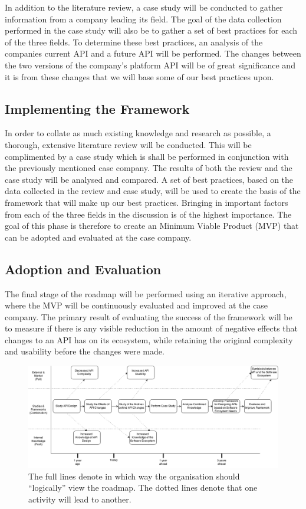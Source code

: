 \documentclass{article}
\begin{document}
In addition to the literature review, a case study will be conducted to gather information from a company leading its field. The goal of the data collection performed in the case study will also be to gather a set of best practices for each of the three fields. To determine these best practices, an analysis of the companies current API and a future API will be performed. The changes between the two versions of the company's platform API will be of great significance and it is from these changes that we will base some of our best practices upon.

\subsection{Implementing the Framework}
In order to collate as much existing knowledge and research as possible, a thorough, extensive literature review will be conducted. This will be complimented by a case study which is shall be performed in conjunction with the previously mentioned case company. The results of both the review and the case study will be analysed and compared. A set of best practices, based on the data collected in the review and case study, will be used to create the basis of the framework that will make up our best practices. Bringing in important factors from each of the three fields in the discussion is of the highest importance. The goal of this phase is therefore to create an Minimum Viable Product (MVP) that can be adopted and evaluated at the case company. 

\subsection{Adoption and Evaluation}
The final stage of the roadmap will be performed using an iterative approach, where the MVP will be continuously evaluated and improved at the case company. The primary result of evaluating the success of the framework will be to measure if there is any visible reduction in the amount of negative effects that changes to an API has on its ecosystem, while retaining the original complexity and usability before the changes were made.

\begin{figure}
\centering
\includegraphics[width=220mm]{RoadMap.png}
\caption{The full lines denote in which way the organisation should ``logically'' view the roadmap. The dotted lines denote that one activity will lead to another. }
\label{fig:roadmap}
\end{figure}
\end{document}
